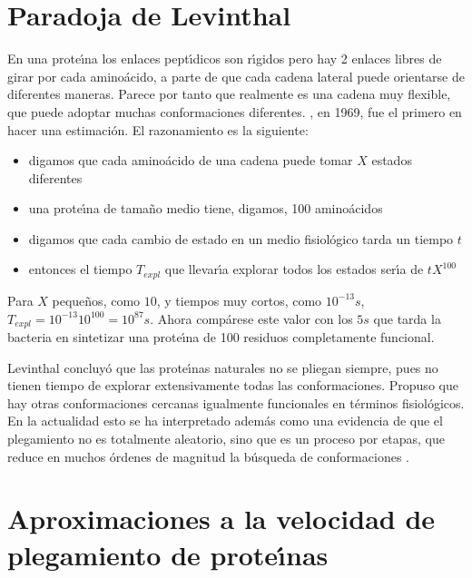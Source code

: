 \section{Paradoja de Levinthal} \label{complejidad2}

En una prote\'\i{}na los enlaces pept\'\i{}dicos son r\'\i{}gidos pero hay 2 enlaces libres de girar por cada amino\'{a}cido,
a parte de que cada cadena lateral puede orientarse de diferentes maneras. Parece por tanto que realmente 
es una cadena muy flexible, que puede adoptar muchas conformaciones diferentes.
, en 1969, fue el primero 
en hacer una estimaci\'{o}n. El razonamiento es la siguiente: 
\begin{itemize}
\item  digamos que cada amino\'{a}cido de una cadena puede tomar $X$ estados diferentes
\item una prote\'\i{}na de tama\~no medio tiene, digamos, 100 amino\'{a}cidos
\item digamos que cada cambio de estado en un medio fisiol\'{o}gico tarda un tiempo $t$
\item entonces el tiempo $T_{expl}$ que llevar\'\i{}a explorar todos los estados ser\'\i{}a de $t X^{100}$
\end{itemize}

Para $X$ peque\~nos, como $10$, y tiempos muy cortos, como $10^{-13} s$, 
$T_{expl} = 10^{-13} 10^{100} = 10^{87}s$. Ahora comp\'{a}rese este valor con los $5s$ que tarda la 
bacteria  en sintetizar una prote\'\i{}na de 100 residuos completamente funcional.

Levinthal concluy\'{o} que las prote\'\i{}nas naturales no se pliegan siempre, %
pues no tienen tiempo de explorar extensivamente todas las conformaciones. 
Propuso que hay otras conformaciones cercanas igualmente funcionales en t\'{e}rminos
fisiol\'{o}gicos. En la actualidad esto se ha interpretado adem\'{a}s como una evidencia de que el plegamiento no
es totalmente aleatorio, sino que es un proceso por etapas, que reduce en muchos \'{o}rdenes de magnitud 
la b\'{u}squeda de conformaciones \citep{Mathews1999,Burra2009,Sali1994}.

\section{Aproximaciones a la velocidad de plegamiento de prote\'\i{}nas} \label{hora2:K}


